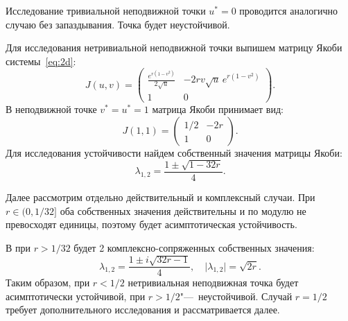 \documentclass[12pt, a4paper]{article} %
\begin{document}
Исследование тривиальной неподвижной точки $u^*=0$ проводится аналогично случаю без запаздывания. 
Точка будет неустойчивой.

Для исследования нетривиальной неподвижной точки выпишем матрицу Якоби системы~\eqref{eq:2d}:
\begin{equation}\label{Jac}
    J(u, v) = 
    \begin{pmatrix}
        \frac{e^{r(1-v^2)}}{2\sqrt{u}} & -2rv\sqrt{u}\,e^{r(1-v^2)} \\
        1 & 0
    \end{pmatrix} 
.\end{equation} 
В неподвижной точке $v^{*}=u^{*} = 1$ матрица Якоби принимает вид:
\begin{equation}\label{Jac_st}
    J(1, 1) = 
    \begin{pmatrix}
        1\!/2 & -2r \\
        1 & 0
    \end{pmatrix} 
.\end{equation} 
Для исследования устойчивости найдем собственный значения матрицы Якоби:
\begin{equation}\label{Jac_eig}
    \lambda_{1,2} = \frac{1 \pm \sqrt{1 - 32r}}{4}
.\end{equation} 

Далее рассмотрим отдельно действительный и комплексный случаи.
При $r \in (0, 1\!/32]$ оба собственных значения действительны и по модулю не превосходят единицы, поэтому будет асимптотическая устойчивость.

В при  $r > 1\!/32$ будет 2 комплексно-сопряженных собственных значения:
 \begin{equation}\label{eq:eig_compl}
     \lambda_{1,2} = \frac{1 \pm i\sqrt{32r - 1}}{4}, \quad 
     \lvert \lambda_{1,2} \rvert = \sqrt{2r}
.\end{equation} 
Таким образом, при $r < 1\!/2$ нетривиальная неподвижная точка будет асимптотически устойчивой, 
при $r > 1\!/2$"---~неустойчивой. 
Случай $r=1\!/2$ требует дополнительного исследования и рассматривается далее.



 
\end{document}

